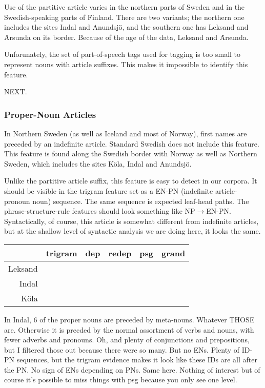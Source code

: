 Use of the partitive article varies in the northern parts of Sweden
and in the Swedish-speaking parts of Finland. There are two variants;
the northern one includes the sites Indal and Anundsj\"o, and the
southern one has Leksand and \.Arsunda on its border. Because of the age of
the data, Leksand and \.Arsunda.

Unforunately, the set of part-of-speech tags used for tagging is too
small to represent nouns with article suffixes. This makes it
impossible to identify this feature.

NEXT.

\subsubsection{Proper-Noun Articles}

In Northern Sweden (as well as Iceland and most of Norway), first
names are preceded by an indefinite article. Standard Swedish does not include
this feature. This feature is found along the Swedish border with
Norway as well as Northern Sweden, which includes the sites K\"ola,
Indal and Anundsj\"o.

Unlike the partitive article suffix, this feature is easy to detect in
our corpora. It should be visible in the trigram feature set as a
EN-PN (indefinite article-pronoun noun) sequence. The same sequence is
expected leaf-head paths. The phrase-structure-rule features should
look something like NP$\to$EN-PN. Syntactically, of course, this article
is somewhat different from indefinite articles, but at the shallow
level of syntactic analysis we are doing here, it looks the same.

\begin{table}
  \begin{tabular}{r|ccccc}
    & trigram & dep & redep & psg & grand \\ \hline
    Leksand & \\
    Indal & \\
    K\"ola & \\
    \end{tabular}
\end{table}

In Indal, 6 of the proper nouns are preceded by
meta-nouns. Whatever THOSE are. Otherwise it is precded by the normal
assortment of verbs and nouns, with fewer adverbs and pronouns. Oh,
and plenty of conjunctions and prepositions, but I filtered those out
because there were so many. But no ENs.
Plenty of ID-PN sequences, but the trigram evidence makes it look like
these IDs are all after the PN. No sign of ENs depending on PNs.
Same here.
Nothing of interest but of course it's possible to miss things with
psg because you only see one level.

